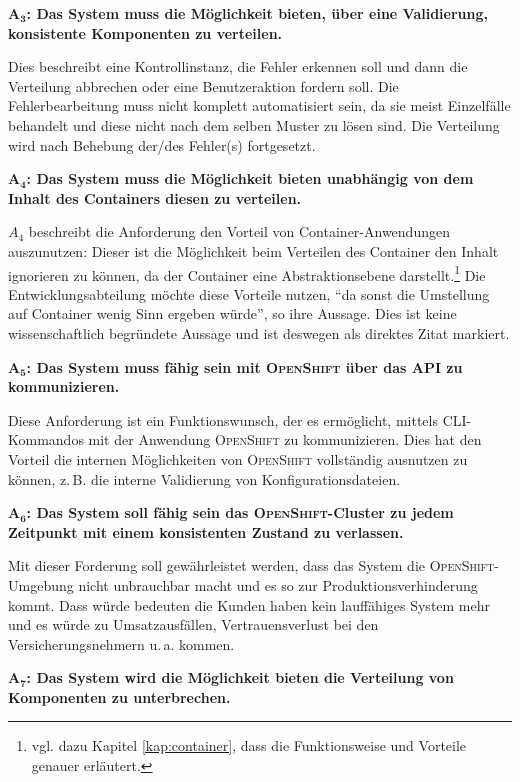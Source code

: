 \par
$\mathbf{A_{3}}$\textbf{: Das System muss die Möglichkeit bieten, über eine Validierung, konsistente Komponenten zu verteilen.}
\par
Dies beschreibt eine Kontrollinstanz, die Fehler erkennen soll und dann die Verteilung abbrechen oder eine Benutzeraktion fordern soll. Die Fehlerbearbeitung muss nicht komplett automatisiert sein, da sie meist Einzelfälle behandelt und diese nicht nach dem selben Muster zu lösen sind. Die Verteilung wird nach Behebung der/des Fehler(s) fortgesetzt.
\par
$\mathbf{A_{4}}$\textbf{: Das System muss die Möglichkeit bieten unabhängig von dem Inhalt des Containers diesen zu verteilen.}
\par
$A_{4}$ beschreibt die Anforderung den Vorteil von Container-Anwendungen auszunutzen: Dieser ist die Möglichkeit beim Verteilen des Container den Inhalt ignorieren zu können, da der Container eine Abstraktionsebene darstellt.\footnote{vgl. dazu Kapitel \vref{kap:container}, dass die Funktionsweise und Vorteile genauer erläutert.} Die Entwicklungsabteilung möchte diese Vorteile nutzen, \enquote{da sonst die Umstellung auf Container wenig Sinn ergeben würde}, so ihre Aussage. Dies ist keine wissenschaftlich begründete Aussage und ist deswegen als direktes Zitat markiert.
\par
$\mathbf{A_{5}}$\textbf{: Das System muss fähig sein mit \textsc{OpenShift} über das \ac{API} zu kommunizieren.}
\par
Diese Anforderung ist ein Funktionswunsch, der es ermöglicht, mittels \ac{CLI}-Kommandos mit der Anwendung \textsc{OpenShift} zu kommunizieren. Dies hat den Vorteil die internen Möglichkeiten von \textsc{OpenShift} vollständig ausnutzen zu können, z.\,B. die interne Validierung von Konfigurationsdateien.
\par
$\mathbf{A_{6}}$\textbf{: Das System soll fähig sein das \textsc{OpenShift}-Cluster zu jedem Zeitpunkt mit einem konsistenten Zustand zu verlassen.}
\par
Mit dieser Forderung soll gewährleistet werden, dass das System die \textsc{OpenShift}-Umgebung nicht unbrauchbar macht und es so zur Produktionsverhinderung kommt. Dass würde bedeuten die Kunden haben kein lauffähiges System mehr und es würde zu Umsatzausfällen, Vertrauensverlust bei den Versicherungsnehmern u.\,a. kommen. 
\par
$\mathbf{A_{7}}$\textbf{: Das System wird die Möglichkeit bieten die Verteilung von Komponenten zu unterbrechen.}
\par
